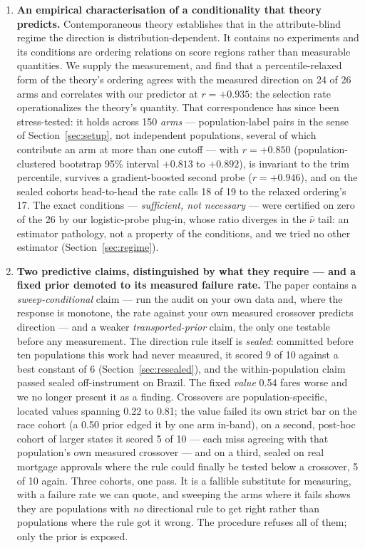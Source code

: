 \documentclass[conference]{IEEEtran}
\begin{document}
\begin{enumerate}
\item \textbf{An empirical characterisation of a conditionality that theory predicts.}
Contemporaneous theory \cite{backfire2026} establishes that in the attribute-blind regime
the direction is distribution-dependent. It contains no experiments and its conditions are
ordering relations on score regions rather than measurable quantities. We supply the
measurement, and find that a percentile-relaxed form of the theory's ordering agrees with
the measured direction on 24 of 26 arms and correlates with our predictor at $r = +0.935$:
the selection rate operationalizes the theory's quantity. That correspondence has since been
stress-tested: it holds across 150 \emph{arms} --- population-label pairs in the sense of
Section~\ref{sec:setup}, not independent populations, several of which contribute an arm at
more than one cutoff --- with $r = +0.850$ (population-clustered bootstrap 95\% interval
$+0.813$ to $+0.892$), is invariant to the trim percentile, survives a gradient-boosted
second probe ($r = +0.946$), and on the sealed cohorts head-to-head the rate calls 18 of 19
to the relaxed ordering's 17. The exact conditions --- \emph{sufficient, not necessary} ---
were certified on zero of the 26 by our logistic-probe plug-in, whose ratio diverges in the
$\hat\nu$ tail: an estimator pathology, not a property of the conditions, and we tried no
other estimator (Section~\ref{sec:regime}).

\item \textbf{Two predictive claims, distinguished by what they require --- and a fixed
prior demoted to its measured failure rate.} The paper contains a \emph{sweep-conditional}
claim --- run the audit on your own data and, where the response is monotone, the rate
against your own measured crossover predicts direction --- and a weaker
\emph{transported-prior} claim, the only one testable before any measurement. The direction
rule itself is \emph{sealed}: committed before ten populations this work had never measured,
it scored 9 of 10 against a best constant of 6 (Section~\ref{sec:resealed}), and the
within-population claim passed sealed off-instrument on Brazil. The fixed \emph{value} 0.54
fares worse and we no longer present it as a finding. Crossovers are population-specific, located values spanning 0.22 to 0.81; the value failed its own strict bar on the race cohort
(a 0.50 prior edged it by one arm in-band), on a second, post-hoc cohort of larger states it scored 5 of 10 --- each miss agreeing with
that population's own measured crossover --- and on a third, sealed on real mortgage approvals
where the rule could finally be tested below a crossover, 5 of 10 again. Three cohorts, one
pass. It is a fallible substitute for measuring, with a failure rate we can quote, and
sweeping the arms where it fails shows they are populations with \emph{no} directional rule
to get right rather than populations where the rule got it wrong. The procedure refuses all
of them; only the prior is exposed.


\end{enumerate}
\end{document}
